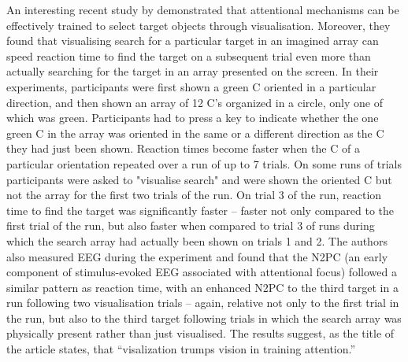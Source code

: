 \documentclass[smallextended]{svjour3}       %
\begin{document}
An interesting recent study by \cite{reinhart2015} demonstrated that attentional mechanisms can be effectively trained to select target objects through visualisation. Moreover, they found that visualising search for a particular target in an imagined array can speed reaction time to find the target on a subsequent trial even more than actually searching for the target in an array presented on the screen. In their experiments, participants were first shown a green C oriented in a particular direction, and then shown an array of 12 C's organized in a circle, only one of which was green. Participants had to press a key to indicate whether the one green C in the array was oriented in the same or a different direction as the C they had just been shown. Reaction times become faster when the C of a particular orientation repeated over a run of up to 7 trials. On some runs of trials participants were asked to "visualise search" and were shown the oriented C but not the array for the first two trials of the run. On trial 3 of the run, reaction time to find the target was significantly faster -- faster not only compared to the first trial of the run, but also faster when compared to trial 3 of runs during which the search array had actually been shown on trials 1 and 2. The authors also measured EEG during the experiment and found that the N2PC (an early component of stimulus-evoked EEG associated with attentional focus) followed a similar pattern as reaction time, with an enhanced N2PC to the third target in a run following two visualisation trials -- again, relative not only to the first trial in the run, but also to the third target following trials in which the search array was physically present rather than just visualised. The results suggest, as the title of the article states, that ``visalization trumps vision in training attention.''
\end{document}
